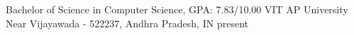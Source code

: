 
\begin{cventries}
  \cventry
    {Bachelor of Science in Computer Science, GPA:  7.83/10.00} %
    {VIT AP University} %
    {Near Vijayawada - 522237, Andhra Pradesh, IN} %
    {present} %
   { }
\end{cventries}
